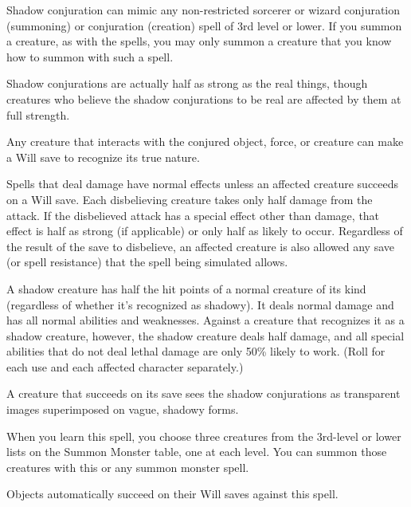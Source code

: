 \begin{spelleffect}
  Shadow conjuration can mimic any non-restricted sorcerer or wizard conjuration (summoning) or conjuration (creation) spell of 3rd level or lower. If you summon a creature, as with the  spells, you may only summon a creature that you know how to summon with such a spell.
  \par Shadow conjurations are actually half as strong as the real things, though creatures who believe the shadow conjurations to be real are affected by them at full strength.
  \par Any creature that interacts with the conjured object, force, or creature can make a Will save to recognize its true nature.
  \par Spells that deal damage have normal effects unless an affected creature succeeds on a Will save. Each disbelieving creature takes only half damage from the attack. If the disbelieved attack has a special effect other than damage, that effect is half as strong (if applicable) or only half as likely to occur. Regardless of the result of the save to disbelieve, an affected creature is also allowed any save (or spell resistance) that the spell being simulated allows.
  \par A shadow creature has half the hit points of a normal creature of its kind (regardless of whether it's recognized as shadowy). It deals normal damage and has all normal abilities and weaknesses. Against a creature that recognizes it as a shadow creature, however, the shadow creature deals half damage, and all special abilities that do not deal lethal damage are only 50\% likely to work. (Roll for each use and each affected character separately.)
\end{spelleffect}
\begin{spellnotes}
  A creature that succeeds on its save sees the shadow conjurations as transparent images superimposed on vague, shadowy forms.
  \par When you learn this spell, you choose three creatures from the 3rd-level or lower lists on the Summon Monster table, one at each level. You can summon those creatures with this or any summon monster spell.
  \par Objects automatically succeed on their Will saves against this spell.
\end{spellnotes}

